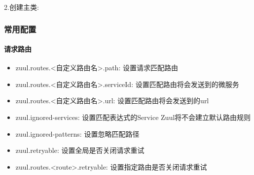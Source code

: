 \documentclass[letterpaper,10pt,english]{sphinxmanual}
\begin{document}
2.创建主类:

\begin{sphinxVerbatim}[commandchars=\\\{\}]
   

       \PYG{p}{[}\PYG{p}{]}  
         

\end{sphinxVerbatim}


\subsubsection{常用配置}
\label{\detokenize{01.spring-cloud/04.zuul/zuul_01:id3}}

\paragraph{请求路由}
\label{\detokenize{01.spring-cloud/04.zuul/zuul_01:id4}}\begin{itemize}
\item {} 
zuul.routes.\textless{}自定义路由名\textgreater{}.path: 设置请求匹配路由

\item {} 
zuul.routes.\textless{}自定义路由名\textgreater{}.serviceId: 设置匹配路由将会发送到的微服务

\item {} 
zuul.routes.\textless{}自定义路由名\textgreater{}.url: 设置匹配路由将会发送到的url

\item {} 
zuul.ignored-services: 设置匹配表达式的Service Zuul将不会建立默认路由规则

\item {} 
zuul.ignored-patterns: 设置忽略匹配路径

\item {} 
zuul.retryable: 设置全局是否关闭请求重试

\item {} 
zuul.routes.\textless{}route\textgreater{}.retryable: 设置指定路由是否关闭请求重试

\end{itemize}
\end{document}
